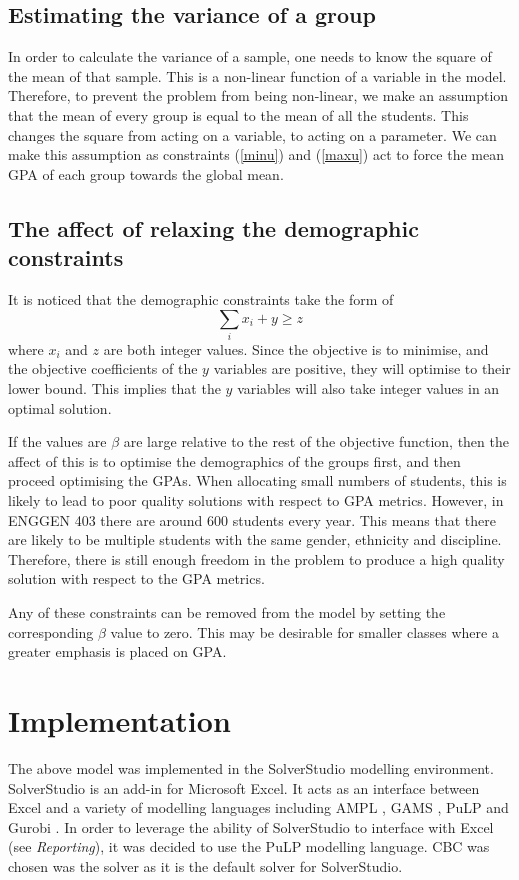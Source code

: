 \documentclass[12pt]{ORSNZ}
\begin{document}
\subsection{Estimating the variance of a group}
In order to calculate the variance of a sample, one needs to know the square of the mean of that sample. This is a non-linear function of a variable in the model. Therefore, to prevent the problem from being non-linear, we make an assumption that the mean of every group is equal to the mean of all the students. This changes the square from acting on a variable, to acting on a parameter. We can make this assumption as constraints (\ref{minu}) and (\ref{maxu}) act to force the mean GPA of each group towards the global mean.

\subsection{The affect of relaxing the demographic constraints}
It is noticed that the demographic constraints take the form of 
\begin{equation}
\sum_i x_i + y \geq z
\end{equation}
where $x_i$ and $z$ are both integer values. Since the objective is to minimise, and the objective coefficients of the $y$ variables are positive, they will optimise to their lower bound. This implies that the $y$ variables will also take integer values in an optimal solution. 

If the values are $\beta$ are large relative to the rest of the objective function, then the affect of this is to optimise the demographics of the groups first, and then proceed optimising the GPAs. When allocating small numbers of students, this is likely to lead to poor quality solutions with respect to GPA metrics. However, in ENGGEN 403 there are around 600 students every year. This means that there are likely to be multiple students with the same gender, ethnicity and discipline. Therefore, there is still enough freedom in the problem to produce a high quality solution with respect to the GPA metrics.

Any of these constraints can be removed from the model by setting the corresponding $\beta$ value to zero. This may be desirable for smaller classes where a greater emphasis is placed on GPA.

\section{Implementation}
The above model was implemented in the SolverStudio \cite{solverstudio} modelling environment. SolverStudio is an add-in for Microsoft Excel. It acts as an interface between Excel and a variety of modelling languages including AMPL \cite{ampl}, GAMS \cite{gams}, PuLP \cite{pulp} and Gurobi \cite{gurobi}. In order to leverage the ability of SolverStudio to interface with Excel (see \emph{Reporting}), it was decided to use the PuLP modelling language. CBC \cite{CBC} was chosen was the solver as it is the default solver for SolverStudio.
\end{document}
